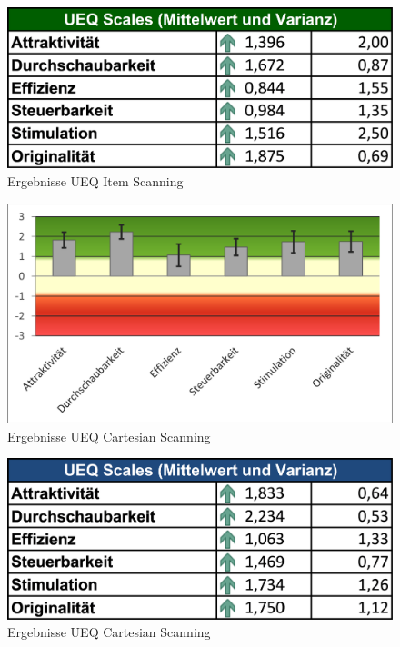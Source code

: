 \begin{figure}[tbh]
 \centering
\includegraphics{images/Results/UEQ-Table-Means-Item.png}
 \caption{Ergebnisse UEQ Item Scanning}
 \label{fig:ueqScalesItem}
\end{figure}

\begin{figure}[tbh]
 \centering
\includegraphics{images/Results/UEQ-Cartesian.png}
 \caption{Ergebnisse UEQ Cartesian Scanning}
 \label{fig:ueqScoreCartesian}
\end{figure}

\begin{figure}[tbh]
 \centering
\includegraphics{images/Results/UEQ-Table-Means-Cartesian.png}
 \caption{Ergebnisse UEQ Cartesian Scanning}
 \label{fig:ueqScalesCartesian}
\end{figure}

